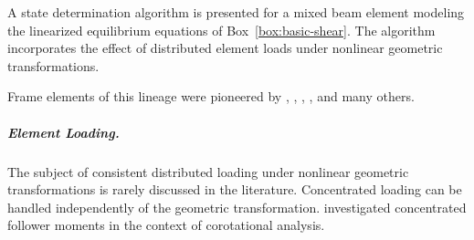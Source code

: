 A state determination algorithm is presented for a mixed beam element modeling the linearized equilibrium equations of Box~\ref{box:basic-shear}. The algorithm incorporates the effect of distributed element loads under nonlinear geometric transformations.

Frame elements of this lineage were pioneered by \cite{kaba1984refined}, \cite{spacone1992beam}, \cite{lee2008huwashizu}, \cite{hjelmstad2003mixed}, and many others. 


%
%





\subparagraph{Element Loading.}
The subject of consistent distributed loading under nonlinear geometric transformations is rarely discussed in the literature. 
Concentrated loading can be handled independently of the geometric transformation. 
\cite{battini2002corotational-thesis} investigated concentrated follower moments in the context of corotational analysis.

